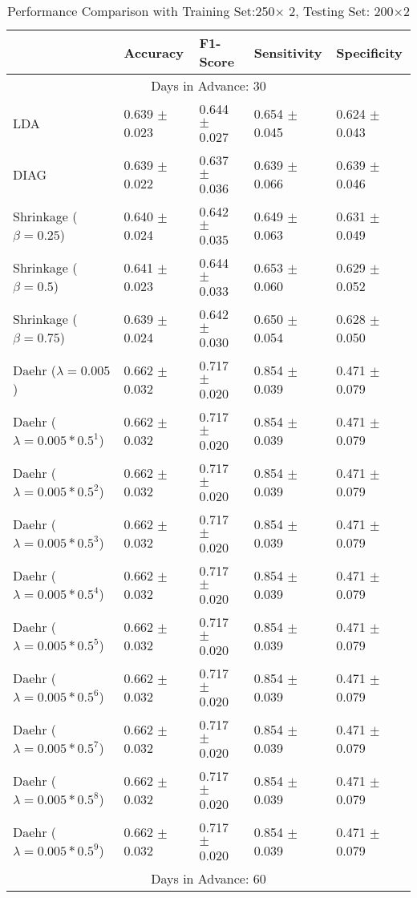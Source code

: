 \begin{table}
\caption{Performance Comparison with Training Set:250$\times$ 2, Testing Set: 200$\times$2}
\footnotesize
\centering
\begin{tabular}{*{5}{l}}
\toprule
 & Accuracy & F1-Score & Sensitivity & Specificity\\
\hline\multicolumn{5}{c}{  Days in Advance: 30}\\\hline
LDA&0.639 $\pm$ 0.023&0.644 $\pm$ 0.027&0.654 $\pm$ 0.045&0.624 $\pm$ 0.043\\
DIAG&0.639 $\pm$ 0.022&0.637 $\pm$ 0.036&0.639 $\pm$ 0.066&0.639 $\pm$ 0.046\\
Shrinkage ($\beta=0.25$)&0.640 $\pm$ 0.024&0.642 $\pm$ 0.035&0.649 $\pm$ 0.063&0.631 $\pm$ 0.049\\
Shrinkage ($\beta=0.5$)&0.641 $\pm$ 0.023&0.644 $\pm$ 0.033&0.653 $\pm$ 0.060&0.629 $\pm$ 0.052\\
Shrinkage ($\beta=0.75$)&0.639 $\pm$ 0.024&0.642 $\pm$ 0.030&0.650 $\pm$ 0.054&0.628 $\pm$ 0.050\\
Daehr ($\lambda=0.005$)&0.662 $\pm$ 0.032&0.717 $\pm$ 0.020&0.854 $\pm$ 0.039&0.471 $\pm$ 0.079\\
Daehr ($\lambda=0.005*0.5^1$)&0.662 $\pm$ 0.032&0.717 $\pm$ 0.020&0.854 $\pm$ 0.039&0.471 $\pm$ 0.079\\
Daehr ($\lambda=0.005*0.5^2$)&0.662 $\pm$ 0.032&0.717 $\pm$ 0.020&0.854 $\pm$ 0.039&0.471 $\pm$ 0.079\\
Daehr ($\lambda=0.005*0.5^3$)&0.662 $\pm$ 0.032&0.717 $\pm$ 0.020&0.854 $\pm$ 0.039&0.471 $\pm$ 0.079\\
Daehr ($\lambda=0.005*0.5^4$)&0.662 $\pm$ 0.032&0.717 $\pm$ 0.020&0.854 $\pm$ 0.039&0.471 $\pm$ 0.079\\
Daehr ($\lambda=0.005*0.5^5$)&0.662 $\pm$ 0.032&0.717 $\pm$ 0.020&0.854 $\pm$ 0.039&0.471 $\pm$ 0.079\\
Daehr ($\lambda=0.005*0.5^6$)&0.662 $\pm$ 0.032&0.717 $\pm$ 0.020&0.854 $\pm$ 0.039&0.471 $\pm$ 0.079\\
Daehr ($\lambda=0.005*0.5^7$)&0.662 $\pm$ 0.032&0.717 $\pm$ 0.020&0.854 $\pm$ 0.039&0.471 $\pm$ 0.079\\
Daehr ($\lambda=0.005*0.5^8$)&0.662 $\pm$ 0.032&0.717 $\pm$ 0.020&0.854 $\pm$ 0.039&0.471 $\pm$ 0.079\\
Daehr ($\lambda=0.005*0.5^9$)&0.662 $\pm$ 0.032&0.717 $\pm$ 0.020&0.854 $\pm$ 0.039&0.471 $\pm$ 0.079\\
\hline\multicolumn{5}{c}{  Days in Advance: 60}\\\hline

\end{tabular}
\end{table}
